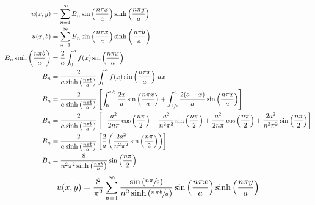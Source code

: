 \documentclass[../../HW07.tex]{subfiles}
\begin{document}
\begin{align*}
    u(x,y)                                     & = \sum_{n=1}^{\infty} B_{n}\sin\left( \frac{n\pi x}{a} \right) \sinh\left( \frac{n\pi y}{a} \right)                                                                                                                                                                                                         \\
    u(x,b)                                     & = \sum_{n=1}^{\infty} B_{n}\sin\left( \frac{n\pi x}{a} \right) \sinh\left( \frac{n\pi b}{a} \right)                                                                                                                                                                                                         \\
    B_{n} \sinh\left( \frac{n\pi b}{a} \right) & = \frac{2}{a} \int_{0}^{a} f(x) \sin\left( \frac{n\pi x}{a} \right)                                                                                                                                                                                                                                         \\
    B_{n}                                      & = \frac{2}{a \sinh\left( \frac{n\pi b}{a} \right)} \int_{0}^{a} f(x) \sin\left( \frac{n\pi x}{a} \right) \,dx                                                                                                                                                                                               \\
    B_{n}                                      & = \frac{2}{a \sinh\left( \frac{n\pi b}{a} \right)} \left[ \int_{0}^{\sfrac{a}{2}} \frac{2x}{a} \sin\left( \frac{n\pi x}{a} \right) + \int_{\sfrac{a}{2}}^{a} \frac{2(a-x)}{a} \sin\left( \frac{n\pi x}{a} \right) \right]                                                                                   \\
    B_{n}                                      & = \frac{2}{a \sinh\left( \frac{n\pi b}{a} \right)} \left[ -\frac{a^{2}}{2n\pi}\cos\left( \frac{n\pi}{2} \right) + \frac{a^{2}}{n^{2}\pi^{2}}\sin\left( \frac{n\pi}{2} \right) + \frac{a^{2}}{2n\pi}\cos\left( \frac{n\pi}{2} \right) + \frac{2a^{2}}{n^{2}\pi^{2}}\sin\left( \frac{n\pi}{2} \right) \right] \\
    B_{n}                                      & = \frac{2}{a \sinh\left( \frac{n\pi b}{a} \right)} \left[ \frac{2}{a} \left( \frac{2a^{2}}{n^{2}\pi^{2}}\sin\left( \frac{n\pi}{2} \right) \right) \right]                                                                                                                                                   \\
    B_{n}                                      & = \frac{8}{n^{2}\pi^{2}\sinh\left( \frac{n\pi b}{a} \right)}\sin\left( \frac{n\pi}{2} \right)
\end{align*}
\begin{gather*}
    u(x,y) = \frac{8}{\pi^{2}} \sum_{n=1}^{\infty} \frac{\sin\left( \sfrac{n\pi}{2} \right)}{n^{2}\sinh\left( \sfrac{n\pi b}{a} \right)} \sin\left( \frac{n\pi x}{a} \right) \sinh\left( \frac{n\pi y}{a} \right)
\end{gather*}
\end{document}
